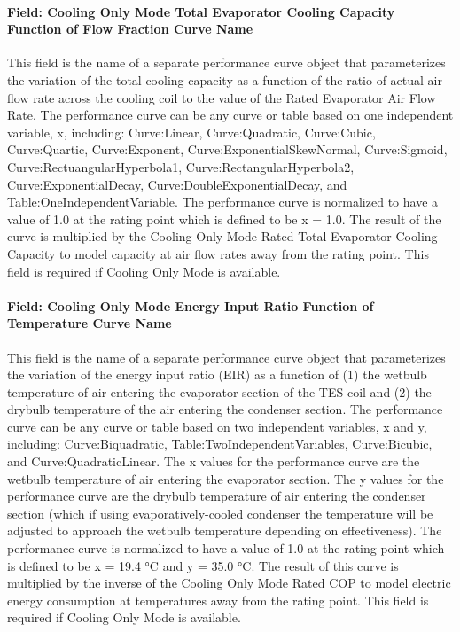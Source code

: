 \paragraph{Field: Cooling Only Mode Total Evaporator Cooling Capacity Function of Flow Fraction Curve Name}\label{field-cooling-only-mode-total-evaporator-cooling-capacity-function-of-flow-fraction-curve-name}

This field is the name of a separate performance curve object that parameterizes the variation of the total cooling capacity as a function of the ratio of actual air flow rate across the cooling coil to the value of the Rated Evaporator Air Flow Rate. The performance curve can be any curve or table based on one independent variable, x, including: Curve:Linear, Curve:Quadratic, Curve:Cubic, Curve:Quartic, Curve:Exponent, Curve:ExponentialSkewNormal, Curve:Sigmoid, Curve:RectuangularHyperbola1, Curve:RectangularHyperbola2, Curve:ExponentialDecay, Curve:DoubleExponentialDecay, and Table:OneIndependentVariable. The performance curve is normalized to have a value of 1.0 at the rating point which is defined to be x = 1.0. The result of the curve is multiplied by the Cooling Only Mode Rated Total Evaporator Cooling Capacity to model capacity at air flow rates away from the rating point. This field is required if Cooling Only Mode is available.

\paragraph{Field: Cooling Only Mode Energy Input Ratio Function of Temperature Curve Name}\label{field-cooling-only-mode-energy-input-ratio-function-of-temperature-curve-name}

This field is the name of a separate performance curve object that parameterizes the variation of the energy input ratio (EIR) as a function of (1) the wetbulb temperature of air entering the evaporator section of the TES coil and (2) the drybulb temperature of the air entering the condenser section. The performance curve can be any curve or table based on two independent variables, x and y, including: Curve:Biquadratic, Table:TwoIndependentVariables, Curve:Bicubic, and Curve:QuadraticLinear. The x values for the performance curve are the wetbulb temperature of air entering the evaporator section. The y values for the performance curve are the drybulb temperature of air entering the condenser section (which if using evaporatively-cooled condenser the temperature will be adjusted to approach the wetbulb temperature depending on effectiveness). The performance curve is normalized to have a value of 1.0 at the rating point which is defined to be x = 19.4 °C and y = 35.0 °C. The result of this curve is multiplied by the inverse of the Cooling Only Mode Rated COP to model electric energy consumption at temperatures away from the rating point. This field is required if Cooling Only Mode is available.

